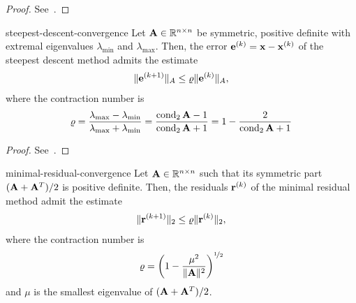 \begin{proof}
  See~\cite[Lemma 5.8]{Saad00}.
\end{proof}

\begin{Theorem}{steepest-descent-convergence}
  Let $\mathbf A\in\mathbb R^{n\times n}$ be symmetric, positive definite with extremal
  eigenvalues $\lambda_{\min}$ and $\lambda_{\max}$. Then, the error
  $\mathbf e^{(k)} = \mathbf x-\mathbf x^{(k)}$ of the steepest descent method admits
  the estimate
  \begin{gather}
    \lVert\mathbf e^{(k+1)}\rVert_A \le \varrho \lVert\mathbf e^{(k)}\rVert_A,
  \end{gather}
  where the contraction number is
  \begin{gather}
    \varrho
    = \frac{\lambda_{\max}-\lambda_{\min}}{\lambda_{\max}+\lambda_{\min}}
    = \frac{\operatorname{cond}_2\mathbf A - 1}{\operatorname{cond}_2\mathbf A+1}
    = 1-\frac2{\operatorname{cond}_2\mathbf A+1}
  \end{gather}
\end{Theorem}

\begin{proof}
  See~\cite[Theorem 5.9]{Saad00}.
\end{proof}

\begin{Theorem}{minimal-residual-convergence}
  Let $\mathbf A\in\mathbb R^{n\times n}$ such that its symmetric part $(\mathbf A+\mathbf A^T)/2$
  is positive definite. Then, the residuals $\mathbf r^{(k)}$ of the minimal
  residual method admit the estimate
  \begin{gather}
    \lVert\mathbf r^{(k+1)}\rVert_2 \le \varrho \lVert\mathbf r^{(k)}\rVert_2,
  \end{gather}
  where the contraction number is
  \begin{gather}
    \varrho = \left(1-\frac{\mu^2}{\lVert\mathbf A\rVert^2}\right)^{\nicefrac12}
  \end{gather}
  and $\mu$ is the smallest eigenvalue of $(\mathbf A+\mathbf A^T)/2$.
\end{Theorem}



